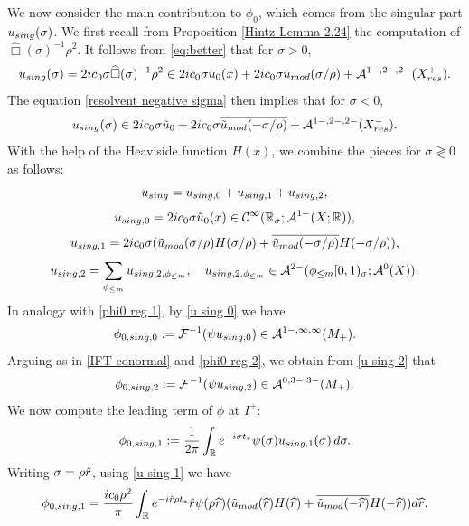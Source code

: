 \documentclass[10pt,a4paper,reqno]{amsart}
\newcommand{\CI}{\mathcal{C}^\infty}
\newcommand{\RR}{\mathbb{R}}
\newcommand{\A}{\mathcal{A}}
\newcommand{\ti}{\tilde}
\let\pminus\pm
\let\hat\widehat
\renewcommand{\pm}{\phi_{\le m}}
\theoremstyle{definition}
\theoremstyle{remark}
\numberwithin{equation}{section}
\newcommand{\xs}{\sigma}
\newcommand{\wh}{\widehat}
\begin{document}
We now consider the main contribution to $\phi_0$, which comes from the singular part $u_{\rm{sing}}(\sigma)$. We first recall from Proposition \ref{Hintz Lemma 2.24} the computation of $\hat\Box(\sigma)^{-1}\rho^2$. It follows from \eqref{eq:better} that for $\sigma>0$,
\[
    u_{\rm{sing}}(\sigma) = 2ic_0 \sigma \wh\Box(\sigma)^{-1}\rho^2 \in 2ic_0\sigma \ti u_0(x) + 2ic_0\sigma \ti u_{\rm mod}(\xs/\rho) + \A^{1-,2-,2-}(X_{\rm{res}}^+).
\]
The equation \eqref{resolvent negative sigma} then implies that for $\sigma<0$,
\[
    u_{\rm{sing}}(\sigma) \in 2ic_0\sigma \ti u_0 + 2ic_0\sigma \overline{ \ti u_{\rm mod}(-\sigma/\rho)} + \A^{1-,2-,2-}(X_{\rm{res}}^-).
\]
With the help of the Heaviside function $H(x)$, we combine the pieces for $\sigma\gtrless 0$ as follows:
\[
    u_{\rm{sing}} = u_{\rm{sing},0} + u_{\rm{sing},1} + u_{\rm{sing},2},
\]
\begin{equation}
\label{u sing 0}
	u_{\rm{sing},0} = 2ic_0 \sigma \ti u_0 (x) \in \CI(\RR_\sigma;\A^{1-}(X;\RR)),
\end{equation}
\begin{equation}
\label{u sing 1}
    u_{\rm{sing},1} = 2ic_0 \sigma ( \ti u_{\rm mod}(\sigma/\rho) H(\sigma/\rho) + \overline{ \ti u_{\rm mod}(-\sigma/\rho)} H(-\sigma/\rho) ),
\end{equation}
\begin{equation}
\label{u sing 2}
    u_{\rm{sing},2} = \sum_{\pminus} u_{\rm{sing},2,\pminus}, \quad u_{\rm{sing},2,\pminus} \in \A^{2-} (\pminus[0,1)_\sigma ; \A^0(X)).
\end{equation}
In analogy with \eqref{phi0 reg 1}, by \eqref{u sing 0} we have
\begin{equation}
\label{phi0 sing 0}
	\phi_{0,\rm{sing},0} := \mathcal{F}^{-1}(\psi u_{\rm{sing},0}) \in \A^{1-,\infty,\infty}(M_+).
\end{equation}
Arguing as in \eqref{IFT conormal} and \eqref{phi0 reg 2}, we obtain from \eqref{u sing 2} that
\begin{equation}
\label{phi0 sing 2}
    \phi_{0,\rm{sing},2} := \mathcal{F}^{-1}(\psi u_{\rm{sing},2}) \in \A^{0,3-,3-}(M_+).
\end{equation}
We now compute the leading term of $\phi$ at $I^+$:
\begin{equation}
\label{phi0 sing 1}
        \phi_{0,\rm{sing},1} := \frac{1}{2\pi}\int_{\RR}e^{-i\sigma t_*}\psi(\sigma)u_{\rm{sing},1}(\sigma)\,d\sigma.
\end{equation}
Writing $\sigma = \rho\Hat{r}$, using \eqref{u sing 1} we have
\[
    \phi_{0,\rm{sing},1} = \frac{ic_0\rho^2}{\pi}\int_{\RR} e^{-i\Hat{r}\rho t_*}\Hat{r}\psi(\rho\hat{r})(\ti u_{\rm mod}(\hat{r}) H(\hat{r}) + \overline{ \ti u_{\rm mod}(-\hat{r})} H(-\hat{r})) d\hat{r}.
\]
\end{document}
